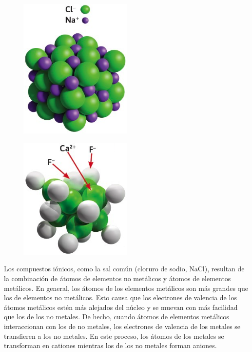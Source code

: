 \documentclass[11pt]{book}
\begin{document}
\begin{minipage}{0.45\textwidth}
  \begin{figure}[H]
    \centering
    \includegraphics[width=0.5\textwidth]{ionicos1.jpg}
    \label{fig:ionicos1}
  \end{figure}
\end{minipage}\hfill
\begin{minipage}{0.45\textwidth}
  \begin{figure}[H]
    \centering
    \includegraphics[width=0.5\textwidth]{ionicos2.jpg}
    \label{fig:ionicos2}
  \end{figure}
\end{minipage}

Los compuestos iónicos, como la sal común (cloruro de sodio, NaCl), resultan de la combinación de
átomos de elementos no metálicos y átomos de elementos metálicos. En general, los átomos de los
elementos metálicos son más grandes que los de elementos no metálicos. Esto causa que los
electrones de valencia de los átomos metálicos estén más alejados del núcleo y se muevan con
más facilidad que los de los no metales. De hecho, cuando átomos de elementos metálicos
interaccionan con los de no metales, los electrones de valencia de los metales se transfieren a
los no metales. En este proceso, los átomos de los metales se transforman en cationes mientras
los de los no metales forman aniones.
\end{document}
